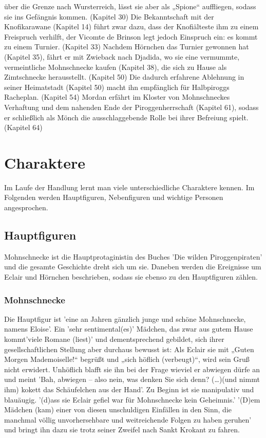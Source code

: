 über die Grenze nach Wursterreich, lässt sie aber als „Spione“ auffliegen, sodass sie ins Gefängnis kommen. (Kapitel 30) 
Die Bekanntschaft mit der Knofikarawane (Kapitel 14) führt zwar dazu, dass der Knofiälteste ihm zu einem Freispruch 
verhilft, der Vicomte de Brinson legt jedoch Einspruch ein: es kommt zu einem Turnier. (Kapitel 33) 
Nachdem Hörnchen das Turnier gewonnen hat (Kapitel 35), fährt er mit Zwieback nach Djadida, wo sie eine vermummte, 
vermeintliche Mohnschnecke kaufen (Kapitel 38), die sich zu Hause als Zimtschnecke herausstellt. (Kapitel 50) 
Die dadurch erfahrene Ablehnung in seiner Heimatstadt (Kapitel 50) macht ihn empfänglich für Halbpiroggs 
Racheplan. (Kapitel 54) Mordan erfährt im Kloster von Mohnschneckes Verhaftung und dem nahenden Ende der 
Piroggenherrschaft (Kapitel 61), sodass er schließlich als Mönch die ausschlaggebende Rolle bei ihrer 
Befreiung spielt. (Kapitel 64)


\section{Charaktere}
Im Laufe der Handlung lernt man viele unterschiedliche Charaktere kennen. Im Folgenden werden Hauptfiguren,  Nebenfiguren und wichtige Personen angesprochen.

\subsection{Hauptfiguren}

Mohnschnecke ist die Hauptprotaginistin des Buches 'Die wilden Piroggenpiraten' und die gesamte Geschichte dreht sich um sie. Daneben werden die Ereignisse um Eclair und Hörnchen beschrieben, sodass sie ebenso zu den Hauptfiguren zählen.

\subsubsection{Mohnschnecke}

Die Hauptfigur ist 'eine an Jahren gänzlich junge und schöne Mohnschnecke, namens Eloise'. \cite[S.13]{pir}
Ein 'sehr sentimental(es)' Mädchen,\cite[S.15]{pir} das  zwar aus gutem Hause kommt\cite[S.14]{pir}'viele Romane (liest)'
und dementsprechend gebildet,\cite[S.15]{pir}  sich ihrer gesellschaftlichen Stellung aber durchaus bewusst ist: 
Als Eclair sie mit „Guten Morgen Mademoiselle!“ begrüßt und „sich höflich (verbeugt)“, wird sein Gruß nicht 
erwidert. \cite[S.16]{pir}Unhöflich blafft sie ihn bei der Frage wieviel er abwiegen dürfe an
und meint 'Bah, abwiegen – also nein, was denken Sie sich denn? (…)(und nimmt ihm) kokett das Schäufelchen aus der Hand'. \cite[S.16]{pir}
Zu Beginn ist sie manipulativ und blauäugig. '(d)ass sie Eclair gefiel war für Mohnschnecke kein Geheimnis.'  \cite[S.17]{pir}
'(D)em Mädchen (kam) einer von diesen unschuldigen Einfällen in den Sinn, die manchmal völlig unvorhersehbare und weitreichende Folgen zu haben geruhen' \cite[S. 19]{pir}
und bringt ihn dazu sie trotz seiner Zweifel nach Sankt Krokant zu fahren. \cite[S. 19]{pir}

